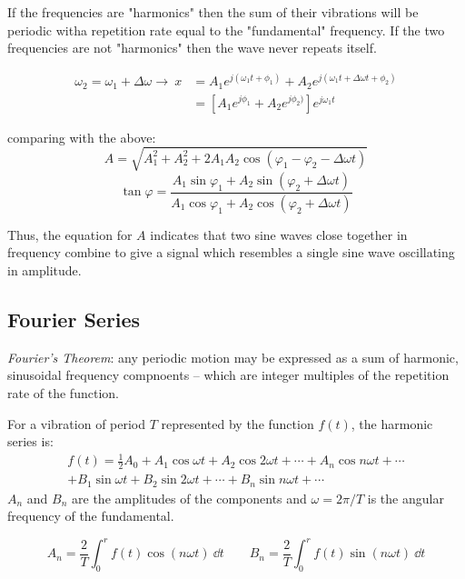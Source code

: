 \documentclass[10pt, a4paper, twocolumn]{article}
\newcommand{\deff}[1]{\par \noindent \textit{#1}: }
\newcommand{\arr}{\ensuremath{\longrightarrow\ }}
\begin{document}
If the frequencies are "harmonics" then the sum of their vibrations will be periodic witha  repetition rate equal to the "fundamental" frequency. If the two frequencies are not "harmonics" then the wave never repeats itself.

\begin{equation*}
\begin{aligned}
\omega _2 = \omega _1 + \Delta \omega
\arr x &= A_1 e^{j(\omega _1 t + \phi _1)}
+ A_2 e^{j(\omega _1 t + \Delta \omega t + \phi _2)}
\\ &= [ A_1 e^{j \phi _1} + A_2 e^{j \phi _2)} ] e^{j \omega _1 t}
\end{aligned}
\end{equation*}

comparing with the above:
\[
A = \sqrt{A_1 ^2 + A_2 ^2 +
2 A_1 A_2 \cos ( \varphi _1 - \varphi _2 - \Delta \omega t)}
\] 
\[\tan \varphi = \frac{A_1 \sin \varphi _1 +
A_2 \sin ( \varphi _2 + \Delta \omega t)}{A_1 \cos \varphi _1
+ A_2 \cos ( \varphi _2 + \Delta \omega t)}
\]

Thus, the equation for $A$ indicates that two sine waves close together in frequency combine to give a signal which resembles a single sine wave oscillating in amplitude.

\subsection{Fourier Series}

\deff{Fourier's Theorem}
any periodic motion may be expressed as a sum of harmonic, sinusoidal frequency compnoents -- which are integer multiples of the repetition rate of the function.

For a vibration of period $T$ represented by the function $f(t)$, the harmonic series is:
\begin{equation*}
\begin{split}
f(t) = \frac12 A_0 + A_1 \cos \omega t + A_2 \cos 2 \omega t
+ \cdots + A_n \cos n \omega t + \cdots
\\ + B_1 \sin \omega t + B_2 \sin 2 \omega t + \cdots
+ B_n \sin n \omega t + \cdots
\end{split}
\end{equation*}
$A_n$ and $B_n$ are the amplitudes of the components and $\omega = 2 \pi /T$ is the angular frequency of the fundamental.

\[ A_n = \frac2T \int _0 ^r f(t) \cos (n \omega t) \ \dd t 
\qquad B_n = \frac2T \int _0 ^r f(t) \sin (n \omega t) \ \dd t \]
\end{document}

